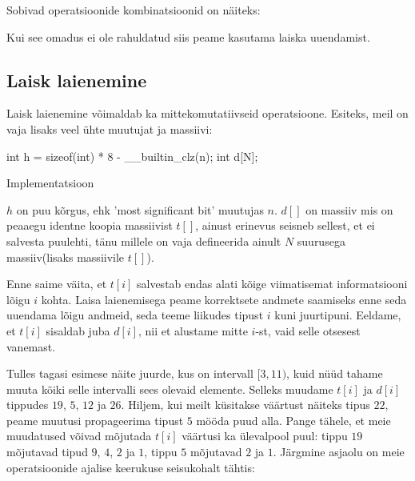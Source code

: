\documentclass{trkut}
\theoremstyle{definition}
\begin{document}
Sobivad operatsioonide kombinatsioonid on näiteks:
\begin{table}[H]
\caption{Sobivad operatsioonid}%
\label{tabel2}%
\end{table}

Kui see omadus ei ole rahuldatud siis peame kasutama laiska uuendamist.
\subsection{Laisk laienemine} 
Laisk laienemine võimaldab ka mittekomutatiivseid operatsioone.
Esiteks, meil on vaja lisaks veel ühte muutujat ja massiivi:
\begin{cclol}
int h = sizeof(int) * 8 - __builtin_clz(n);
int d[N];  
\end{cclol}
\begin{kk}[H]%
    \caption{Implementatsioon}%
    \label{CPH}%
    \end{kk}
$h$ on puu kõrgus, ehk 'most significant bit' muutujas $n$. $d[]$ on massiiv mis on peaaegu identne koopia massiivist $t[]$, ainust erinevus seisneb sellest, et ei salvesta puulehti, tänu millele on vaja defineerida ainult $N$ suurusega massiiv(lisaks massiivile $t[]$).

Enne saime väita, et $t[i]$ salvestab endas alati kõige viimatisemat informatsiooni lõigu $i$ kohta. Laisa laienemisega peame korrektsete andmete saamiseks enne seda uuendama lõigu andmeid, seda teeme liikudes tipust $i$ kuni juurtipuni. Eeldame, et $t[i]$ sisaldab juba $d[i]$, nii et alustame mitte $i$-st, vaid selle otsesest vanemast.

Tulles tagasi esimese näite juurde, kus on intervall $[3, 11)$, kuid nüüd tahame muuta kõiki selle intervalli sees olevaid elemente. Selleks muudame $t[i]$ ja $d[i]$ tippudes $19$, $5$, $12$ ja $26$. Hiljem, kui meilt küsitakse väärtust näiteks tipus $22$, peame muutusi propageerima tipust $5$ mööda puud alla. Pange tähele, et meie muudatused võivad mõjutada $t[i]$ väärtusi ka ülevalpool puul: tippu $19$ mõjutavad tipud $9$, $4$, $2$ ja $1$, tippu $5$ mõjutavad $2$ ja $1$. Järgmine asjaolu on meie operatsioonide ajalise keerukuse seisukohalt tähtis:
\end{document}
